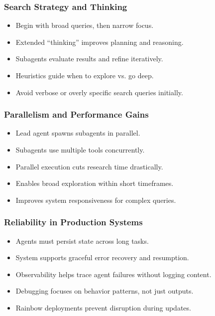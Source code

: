 \begin{frame}[fragile]\frametitle{Search Strategy and Thinking}
    \begin{itemize}
        \item Begin with broad queries, then narrow focus.
        \item Extended ``thinking'' improves planning and reasoning.
        \item Subagents evaluate results and refine iteratively.
        \item Heuristics guide when to explore vs. go deep.
        \item Avoid verbose or overly specific search queries initially.
    \end{itemize}
\end{frame}

\begin{frame}[fragile]\frametitle{Parallelism and Performance Gains}
    \begin{itemize}
        \item Lead agent spawns subagents in parallel.
        \item Subagents use multiple tools concurrently.
        \item Parallel execution cuts research time drastically.
        \item Enables broad exploration within short timeframes.
        \item Improves system responsiveness for complex queries.
    \end{itemize}
\end{frame}

\begin{frame}[fragile]\frametitle{Reliability in Production Systems}
    \begin{itemize}
        \item Agents must persist state across long tasks.
        \item System supports graceful error recovery and resumption.
        \item Observability helps trace agent failures without logging content.
        \item Debugging focuses on behavior patterns, not just outputs.
        \item Rainbow deployments prevent disruption during updates.
    \end{itemize}
\end{frame}

